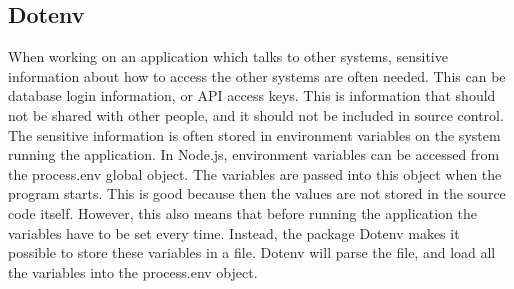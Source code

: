 \subsection{Dotenv}
When working on an application which talks to other systems, sensitive information about how to access the other systems are often needed. This can be database login information, or API access keys. This is information that should not be shared with other people, and it should not be included in source control. The sensitive information is often stored in environment variables on the system running the application. In Node.js, environment variables can be accessed from the process.env global object. The variables are passed into this object when the program starts. This is good because then the values are not stored in the source code itself. However, this also means that before running the application the variables have to be set every time. Instead, the package Dotenv\cite{dotenv} makes it possible to store these variables in a file. Dotenv will parse the file, and load all the variables into the process.env object.
